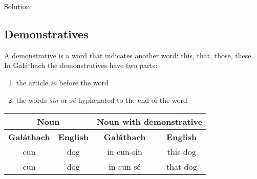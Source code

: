 \newpage
Solution:
\begin{table}[H]
\centering
{}
\label{solution_possessive_pronouns}
\caption{Solution: possessive pronouns}
\end{table}

\newpage
\subsection{Demonstratives}

A demonstrative is a word that indicates another word: this, that, those, these.\\
In Gal\'{a}thach the demonstratives have two parts:
\begin{enumerate}
\item{the article \textit{in} before the word}
\item{the words \textit{sin} or \textit{s\'{e}} hyphenated to the end of the word}
\end{enumerate}

\begin{table}[H]
\centering
\begin{tabular}{cccc}
  \toprule
  \multicolumn{2}{c}{\textbf{Noun}} & \multicolumn{2}{c}{\textbf{Noun with demonstrative}}\\
  \midrule
  \textbf{Gal\'{a}thach} & \textbf{English} & \textbf{Gal\'{a}thach} & \textbf{English}\\
  \cmidrule(lr){1-1}\cmidrule(lr){2-2}\cmidrule(lr){3-3}\cmidrule(lr){4-4}
  cun & dog & in cun-sin & this dog\\
  cun & dog &  in cun-s\'{e} & that dog\\
  \bottomrule
\end{tabular}
\label{examples_demonstrative}
\end{table}

